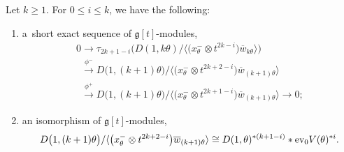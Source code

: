 \begin{theorem}
\label{MT}
Let $k\geq 1$.
For $0\leq i \leq k$, we have the following:
\begin{enumerate}\itemsep=0pt
\item[$1)$] a~short exact sequence of $\mathfrak{g}[t]$-modules,
\begin{gather*}
0\rightarrow \tau_{2k+1-i} \big(D(1, k\theta)/\big\langle \big(x^{-}_\theta \otimes t^{2k-i}\big) \overline{w}_{k\theta}\big\rangle\big)
\\
\phantom{0}
\xrightarrow{\phi^{-}} D\big(1,(k+1)\theta\big)/\big\langle \big(x^{-}_\theta \otimes t^{2k+2-i}\big) \overline{w}_{(k+1)\theta}\big\rangle
\\
\phantom{0}
\xrightarrow{\phi^+} D\big(1,(k+1)\theta\big)/\big\langle \big(x^{-}_\theta \otimes t^{2k+1-i}\big) \overline{w}_{(k+1)\theta}\big\rangle \rightarrow 0;
\end{gather*}
\item[$2)$] an isomorphism of $\mathfrak{g}[t]$-modules,
\begin{gather*}
D\big(1,(k+1)\theta\big)/\langle \big(x^{-}_\theta \otimes t^{2k+2-i}\big) \overline{w}_{(k+1)\theta}\rangle \cong D(1,\theta)^{* (k+1-i)}* \textup{ev}_0 V(\theta)^{*i}.
\end{gather*}
\end{enumerate}
\end{theorem}
